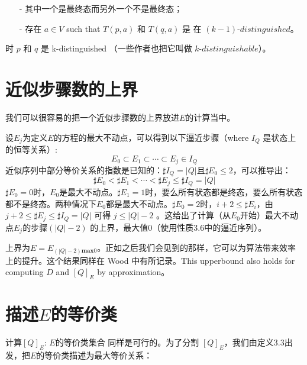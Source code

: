 \begin{itemize}
    \item [-] 其中一个是最终态而另外一个不是最终态；
    \item [-] 存在 $a\in V$ such that $T(p,a)$ 和 $T(q,a)$ 是 在 $(k-1)$-$distinguished$。
\end{itemize}
时 $p$ 和 $q$ 是 k-distinguished （一些作者也把它叫做 $k$-$distinguishable$）。

\section{近似步骤数的上界}
我们可以很容易的把一个近似步骤数的上界放进$E$的计算当中。

设$E_j$为定义$E$的方程的最大不动点，可以得到以下逼近步骤（where $I_Q$ 是状态上的恒等关系）:
\[  E_0 \subset E_1 \subset \cdots \subset E_j \in I_Q \]
近似序列中部分等价关系的指数是已知的：$\sharp I_Q = |Q| \mbox{且} \sharp E_0 \leq 2$，可以推导出：
\[ \sharp E_0 < \sharp E_1 < \cdots < \sharp E_j \leq \sharp I_Q = |Q| \]
$\sharp E_0=0$时，$E_0$是最大不动点。$\sharp E_1=1$时，要么所有状态都是终态，要么所有状态都不是终态。两种情况下$E_0$都是最大不动点。$\sharp E_0=2$时，$i+2 \leq \sharp E_i$，由 $ j+2 \leq \sharp E_j \leq \sharp I_Q = |Q| $ 可得 $j \leq |Q|-2 $ 。这给出了计算（从$E_0$开始）最大不动点$E_j$的步骤$(|Q|-2)$ 的上界，最大值0（使用性质3.6中的逼近序列）。

上界为$E=E_{(|Q|-2)\textbf{max} 0}$。正如之后我们会见到的那样，它可以为算法带来效率上的提升。这个结果同样在 Wood \cite[引理  2.4.1]{Wood87} 中有所记录。This upperbound also holds for computing $D$ and $[Q]_E$ by approximation。


\section{描述$E$的等价类}

计算$[Q]_E$: $E$的等价类集合 同样是可行的。为了分割 $[Q]_E$，我们由定义3.3出发，把$E$的等价类描述为最大等价关系：


